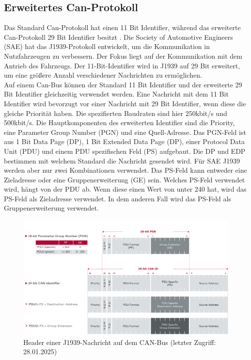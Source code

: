 \subsection{Erweitertes Can-Protokoll}
Das Standard Can-Protokoll hat einen 11 Bit Identifier, während das erweiterte Can-Protokoll 29 Bit Identifier
besitzt \cite{Murvay2018}.
Die Society of Automotive Engineers (SAE) hat das J1939-Protokoll entwickelt, um die Kommunikation in Nutzfahrzeugen
zu verbessern. Der Fokus liegt auf der Kommunikation mit dem Antrieb des Fahrzeugs. Der 11-Bit-Identifier wird in J1939 
auf 29 Bit erweitert, um eine größere Anzahl verschiedener Nachrichten zu ermöglichen.\\
Auf einem Can-Bus können der Standard 11 Bit Identifier und der erweiterte 29 Bit Identifier gleichzeitig verwendet werden.
Eine Nachricht mit dem 11 Bit Identifier wird bevorzugt vor einer Nachricht mit 29 Bit Identifier, wenn diese die gleiche
Priorität haben. Die spezifierten Baudraten sind hier 250kbit/s und 500kbit/s. Die Hauptkomponenten des
erweiterten Identifier sind die Priority, eine Parameter Group Number (PGN) und eine Quell-Adresse.
Das PGN-Feld ist aus 1 Bit Data Page (DP), 1 Bit Extended Data Page (DP), einer Protocol Data Unit (PDU) und einem PDU spezifischen 
Feld (PS) aufgebaut. Die DP und EDP bestimmen mit welchem Standard die 
Nachricht gesendet wird. Für SAE J1939 werden aber nur zwei Kombinationen verwendet. 
Das PS-Feld kann entweder eine Zieladresse oder eine Gruppenerweiterung (GE) sein. Welches PS-Feld
verwendet wird, hängt von der PDU ab. Wenn diese einen Wert von unter 240 hat, wird das PS-Feld als Zieladresse verwendet. 
In dem anderen Fall wird das PS-Feld als Gruppenerweiterung verwendet.
\begin{figure}[H]
    \centering
    \includegraphics[scale=0.28]{images/j1939header.png}
    \caption{Header einer J1939-Nachricht auf dem CAN-Bus \cite{VectorSAE}(letzter Zugriff: 28.01.2025)}
    \label{fig:j1939header}
\end{figure}

